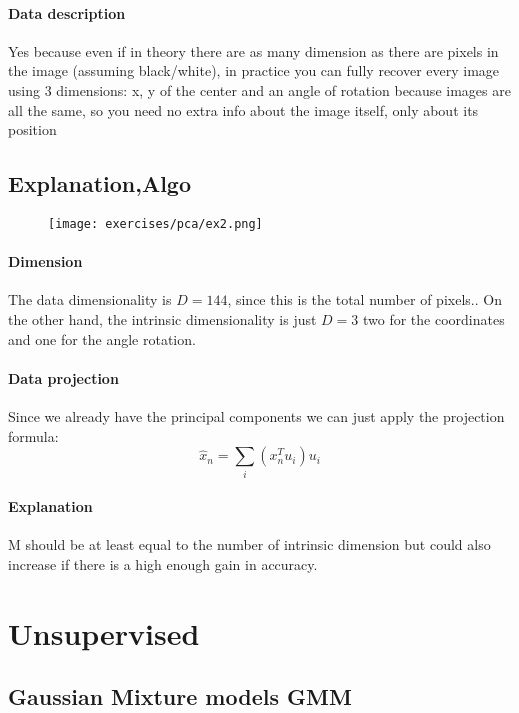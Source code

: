 \paragraph{Data description}
Yes because even if in theory there are as many dimension as there are pixels in the image (assuming black/white), in practice you can fully recover every image using 3 dimensions: x, y of the center and an angle of rotation because images are all the same, so you need no extra info about the image itself, only about its position

\subsection{Explanation,Algo }

\begin{figure}[H]
    \centering
    \texttt{[image: exercises/pca/ex2.png]}
\end{figure}

\paragraph{Dimension}
The data dimensionality is $D=144$, since this is the total number of pixels.. On the other hand, the intrinsic dimensionality is just $D=3$ two for the coordinates and one for the angle rotation.

\paragraph{Data projection}
Since we already have the principal components we can just apply the projection formula:
$$\hat{x}_n=\sum_i(x^T_nu_i)u_i$$

\paragraph{Explanation}
M should be at least equal to the number of intrinsic dimension but could also increase if there is a high enough gain in accuracy.



\section{Unsupervised}



\subsection{Gaussian Mixture models GMM}

